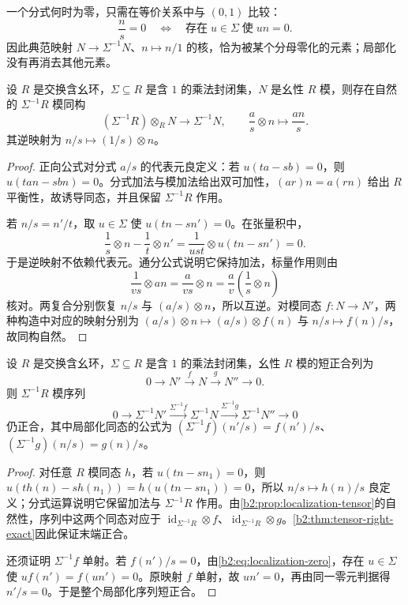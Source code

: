 \ProseParagraphBreak
一个分式何时为零，只需在等价关系中与 \((0,1)\) 比较：
\begin{equation}\label{b2:eq:localization-zero}
	\frac ns=0\quad\Longleftrightarrow\quad \text{存在}\;u\in\Sigma\;\text{使}\;un=0.
\end{equation}
因此典范映射 \(N\to\Sigma^{-1}N\)、\(n\mapsto n/1\) 的核，恰为被某个分母零化的元素；局部化没有再消去其他元素。

\begin{proposition}[局部化的张量描述]\label{b2:prop:localization-tensor}
	设 \(R\) 是交换含幺环，\(\Sigma\subseteq R\) 是含 \(1\) 的乘法封闭集，\(N\) 是幺性 \(R\) 模，则存在自然的 \(\Sigma^{-1}R\) 模同构
	\[
		(\Sigma^{-1}R)\otimes_RN\longrightarrow\Sigma^{-1}N, \qquad \frac as\otimes n\longmapsto\frac{an}s.
	\]
	其逆映射为 \(n/s\mapsto(1/s)\otimes n\)。
\end{proposition}
\begin{proof}
	正向公式对分式 \(a/s\) 的代表元良定义：若 \(u(ta-sb)=0\)，则 \(u(tan-sbn)=0\)。分式加法与模加法给出双可加性，\((ar)n=a(rn)\) 给出 \(R\) 平衡性，故诱导同态，并且保留 \(\Sigma^{-1}R\) 作用。

	若 \(n/s=n'/t\)，取 \(u\in\Sigma\) 使 \(u(tn-sn')=0\)。在张量积中，
	\[
		\frac1s\otimes n-\frac1t\otimes n' =\frac1{ust}\otimes u(tn-sn')=0.
	\]
	于是逆映射不依赖代表元。通分公式说明它保持加法，标量作用则由
	\[
		\frac1{vs}\otimes an=\frac a{vs}\otimes n =\frac av\left(\frac1s\otimes n\right)
	\]
	核对。两复合分别恢复 \(n/s\) 与 \((a/s)\otimes n\)，所以互逆。对模同态 \(f:N\to N'\)，两种构造中对应的映射分别为 \((a/s)\otimes n\mapsto(a/s)\otimes f(n)\) 与 \(n/s\mapsto f(n)/s\)，故同构自然。
\end{proof}

\begin{proposition}\label{b2:prop:localization-exact}
	设 \(R\) 是交换含幺环，\(\Sigma\subseteq R\) 是含 \(1\) 的乘法封闭集，幺性 \(R\) 模的短正合列为
	\[
		0\longrightarrow N'\xrightarrow{f}N\xrightarrow{g}N''\longrightarrow0.
	\]
	则 \(\Sigma^{-1}R\) 模序列
	\[
		0\longrightarrow\Sigma^{-1}N' \xrightarrow{\Sigma^{-1}f}\Sigma^{-1}N \xrightarrow{\Sigma^{-1}g}\Sigma^{-1}N''\longrightarrow0
	\]
	仍正合，其中局部化同态的公式为 \((\Sigma^{-1}f)(n'/s)=f(n')/s\)、\((\Sigma^{-1}g)(n/s)=g(n)/s\)。
\end{proposition}
\begin{proof}
	对任意 \(R\) 模同态 \(h\)，若 \(u(tn-sn_1)=0\)，则 \(u(th(n)-sh(n_1))=h(u(tn-sn_1))=0\)，所以 \(n/s\mapsto h(n)/s\) 良定义；分式运算说明它保留加法与 \(\Sigma^{-1}R\) 作用。由\cref{b2:prop:localization-tensor}的自然性，序列中这两个同态对应于 \(\operatorname{id}_{\Sigma^{-1}R}\otimes f\)、\(\operatorname{id}_{\Sigma^{-1}R}\otimes g\)。\cref{b2:thm:tensor-right-exact}因此保证末端正合。

	还须证明 \(\Sigma^{-1}f\) 单射。若 \(f(n')/s=0\)，由\eqref{b2:eq:localization-zero}，存在 \(u\in\Sigma\) 使 \(uf(n')=f(un')=0\)。原映射 \(f\) 单射，故 \(un'=0\)，再由同一零元判据得 \(n'/s=0\)。于是整个局部化序列短正合。
\end{proof}

